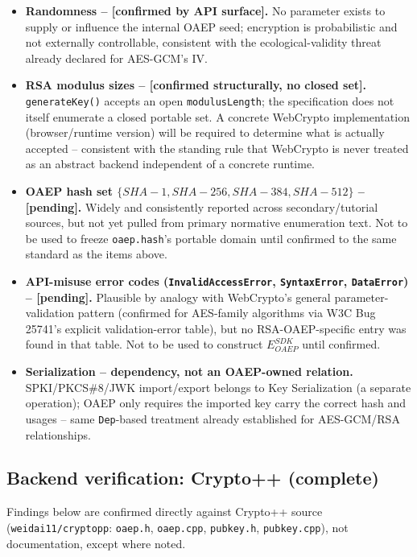 \documentclass[11pt,a4paper]{article}
\begin{document}
\begin{itemize}
\item \textbf{Randomness -- [confirmed by API surface].} No parameter exists to supply or influence the internal OAEP seed; encryption is probabilistic and not externally controllable, consistent with the ecological-validity threat already declared for AES-GCM's IV.
\item \textbf{RSA modulus sizes -- [confirmed structurally, no closed set].} \texttt{generateKey()} accepts an open \texttt{modulusLength}; the specification does not itself enumerate a closed portable set. A concrete WebCrypto implementation (browser/runtime version) will be required to determine what is actually accepted -- consistent with the standing rule that WebCrypto is never treated as an abstract backend independent of a concrete runtime.
\item \textbf{OAEP hash set $\{SHA{-}1, SHA{-}256, SHA{-}384, SHA{-}512\}$ -- [pending].} Widely and consistently reported across secondary/tutorial sources, but not yet pulled from primary normative enumeration text. Not to be used to freeze \texttt{oaep.hash}'s portable domain until confirmed to the same standard as the items above.
\item \textbf{API-misuse error codes (\texttt{InvalidAccessError}, \texttt{SyntaxError}, \texttt{DataError}) -- [pending].} Plausible by analogy with WebCrypto's general parameter-validation pattern (confirmed for AES-family algorithms via W3C Bug 25741's explicit validation-error table), but no RSA-OAEP-specific entry was found in that table. Not to be used to construct $E_{OAEP}^{SDK}$ until confirmed.
\item \textbf{Serialization -- dependency, not an OAEP-owned relation.} SPKI/PKCS\#8/JWK import/export belongs to Key Serialization (a separate operation); OAEP only requires the imported key carry the correct hash and usages -- same \texttt{Dep}-based treatment already established for AES-GCM/RSA relationships.
\end{itemize}

\subsection{Backend verification: Crypto++ (complete)}
Findings below are confirmed directly against Crypto++ source (\texttt{weidai11/cryptopp}: \texttt{oaep.h}, \texttt{oaep.cpp}, \texttt{pubkey.h}, \texttt{pubkey.cpp}), not documentation, except where noted.
\end{document}
